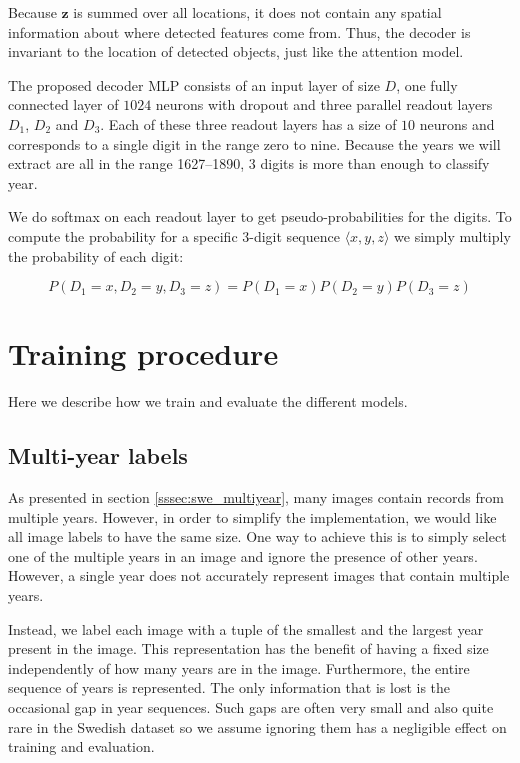 Because $\mathbf{z}$ is summed over all locations, it does not contain any spatial information about where detected features come from.
Thus, the decoder is invariant to the location of detected objects, just like the attention model.

The proposed decoder MLP consists of an input layer of size $D$, one fully connected layer of $1024$ neurons with dropout and three parallel readout layers $D_1$, $D_2$ and $D_3$. Each of these three readout layers has a size of $10$ neurons and corresponds to a single digit in the range zero to nine.
Because the years we will extract are all in the range 1627--1890, $3$ digits is more than enough to classify year.

We do softmax on each readout layer to get pseudo-probabilities for the digits.
To compute the probability for a specific 3-digit sequence $\langle x, y, z \rangle$ we simply multiply the probability of each digit:

\[
P(D_1=x, D_2=y, D_3=z) = P(D_1=x) P(D_2=y) P(D_3=z)
\]


\section{Training procedure}

Here we describe how we train and evaluate the different models.

\subsection{Multi-year labels}

As presented in section \ref{sssec:swe_multiyear}, many images contain records from multiple years. However, in order to simplify the implementation, we would like all image labels to have the same size.
One way to achieve this is to simply select one of the multiple years in an image and ignore the presence of other years. However, a single year does not accurately represent images that contain multiple years.

Instead, we label each image with a tuple of the smallest and the largest year present in the image. This representation has the benefit of having a fixed size independently of how many years are in the image. Furthermore, the entire sequence of years is represented. The only information that is lost is the occasional gap in year sequences. Such gaps are often very small and also quite rare in the Swedish dataset so we assume ignoring them has a negligible effect on training and evaluation.

